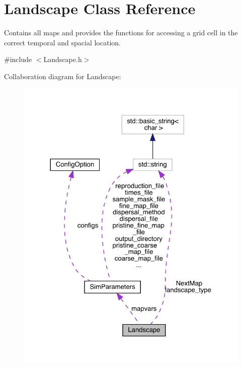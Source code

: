 \hypertarget{class_landscape}{}\section{Landscape Class Reference}
\label{class_landscape}


Contains all maps and provides the functions for accessing a grid cell in the correct temporal and spacial location.  




{\ttfamily \#include $<$Landscape.\+h$>$}



Collaboration diagram for Landscape\+:
\nopagebreak
\begin{figure}[H]
\begin{center}
\leavevmode
\includegraphics[width=324pt]{class_landscape__coll__graph}
\end{center}
\end{figure}
